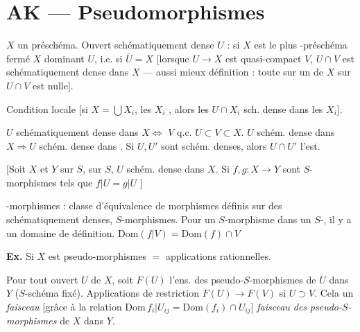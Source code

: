 \documentclass[11pt,a4paper]{article}
\begin{document}
\section{AK — Pseudomorphismes}

$X$ un préschéma.
Ouvert schématiquement \struck{\ill{}} dense $U$ : si $X$ est le plus  -préschéma fermé \ill{} $X$ dominant $U$, i.e. si $\overline{U} = X$ [lorsque $U \to X$ est quasi-compact \ill{} \ill{} \ill{} $V$, $U \cap V$ est schématiquement dense dans $X$ --- aussi \ill{} \ill{} \ill{} mieux \ill{} \ill{} définition : toute   sur un \ill{} de $X$ \ill{} sur $U \cap V$ est nulle].

\struck{\ill{}} Condition locale \ill{} \ill{}  [si $X = \bigcup X_{i}$, les $X_{i}$ \ill{}, alors \ill{} les $U \cap X_{i}$ sch. dense dans les $X_{i}$].

$U$ schématiquement dense dans $X \Longleftrightarrow$ \ill{} \ill{} $V$ q.c. $U \subset V \subset X$.
$U$ schém. dense dans $X \Rightarrow U$ schém. dense dans \ill{} \ill{}.
Si $U, U'$ sont schém. denses, alors $U \cap U'$ l'est.

\marginal{\ill{} \ill{}}

[Soit $X$ et $Y$ sur $S$,    sur $S$,  $U$ schém. dense dans $X$.
Si $f, g : X \to Y$ sont \ill{} $S$-morphismes tels que $f|U = g|U$ \ill{}]

\struck{\ill{}} -morphismes : classe d'équivalence  de morphismes définis sur des \ill{} schématiquement denses,  \ill{} $S$-morphismes. Pour un \ill{} $S$-morphisme dans un $S$-, il y a un  domaine de définition.
 $\mathrm{Dom}(f|V) = \mathrm{Dom}(f) \cap V$

\textbf{Ex.} Si $X$ est  
pseudo-morphismes $=$ applications rationnelles.

Pour tout ouvert $U$ de $X$, soit $F(U)$ l'ens. des pseudo-$S$-morphismes de $U$ dans $Y$ ($S$-schéma fixé). Applications de restriction $F(U) \to F(V)$ si $U \supset V$. Cela   un \emph{faisceau} [grâce à la relation $\mathrm{Dom}\, f_{i}|U_{ij} = \mathrm{Dom}(f_{i}) \cap U_{ij}$]  \emph{faisceau des} \struck{\ill{}} \emph{pseudo-$S$-morphismes} de $X$ dans $Y$.
\end{document}
